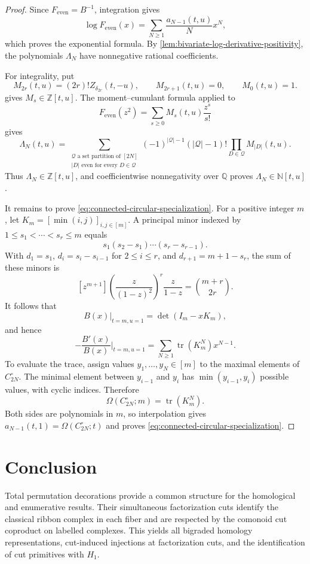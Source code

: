 \documentclass{amsart}
\theoremstyle{definition}
\theoremstyle{remark}
\begin{document}
\begin{proof}
Since $F_{\mathrm{even}}=B^{-1}$, integration gives
\[
 \log F_{\mathrm{even}}(x)
 =\sum_{N\geq1}\frac{a_{N-1}(t,u)}{N}x^N,
\]
which proves the exponential formula.  By
\cref{lem:bivariate-log-derivative-positivity}, the polynomials
$\Lambda_N$ have nonnegative rational coefficients.

For integrality, put
\[
 M_{2r}(t,u)=(2r)!Z_{\delta_{2r}}(t,-u),\qquad
 M_{2r+1}(t,u)=0,\qquad M_0(t,u)=1.
\]
 gives $M_s\in\mathbb Z[t,u]$.  The
moment--cumulant formula applied to
\[
 F_{\mathrm{even}}(z^2)=\sum_{s\geq0}M_s(t,u)\frac{z^s}{s!}
\]
gives
\[
 \Lambda_N(t,u)=
 \sum_{\substack{\mathcal Q\text{ a set partition of }[2N]\\
                   |D|\text{ even for every }D\in\mathcal Q}}
 (-1)^{|\mathcal Q|-1}(|\mathcal Q|-1)!
 \prod_{D\in\mathcal Q}M_{|D|}(t,u).
\]
Thus $\Lambda_N\in\mathbb Z[t,u]$, and coefficientwise nonnegativity over
$\mathbb Q$ proves $\Lambda_N\in\mathbb N[t,u]$.

It remains to prove \eqref{eq:connected-circular-specialization}.  For a
positive integer $m$, let $K_m=[\min(i,j)]_{i,j\in[m]}$.  A principal minor
indexed by $1\leq s_1<\cdots<s_r\leq m$ equals
\[
 s_1(s_2-s_1)\cdots(s_r-s_{r-1}).
\]
With $d_1=s_1$, $d_i=s_i-s_{i-1}$ for $2\leq i\leq r$, and
$d_{r+1}=m+1-s_r$, the sum of these minors is
\[
 [z^{m+1}]
 \left(\frac{z}{(1-z)^2}\right)^r\frac{z}{1-z}
 =\binom{m+r}{2r}.
\]
It follows that
\[
 B(x)|_{t=m,u=1}=\det(I_m-xK_m),
\]
and hence
\[
 -\frac{B'(x)}{B(x)}\bigg|_{t=m,u=1}
 =\sum_{N\geq1}\operatorname{tr}(K_m^N)x^{N-1}.
\]
To evaluate the trace, assign values $y_1,\ldots,y_N\in[m]$ to the maximal
elements of $C_{2N}^{\circ}$.  The minimal element between $y_{i-1}$ and
$y_i$ has $\min(y_{i-1},y_i)$ possible values, with cyclic indices.  Therefore
\[
 \Omega(C_{2N}^{\circ};m)=\operatorname{tr}(K_m^N).
\]
Both sides are polynomials in $m$, so interpolation gives
$a_{N-1}(t,1)=\Omega(C_{2N}^{\circ};t)$ and proves
\eqref{eq:connected-circular-specialization}.
\end{proof}

\section{Conclusion}
\label{sec:conclusion}

Total permutation decorations provide a common structure for the homological
and enumerative results.  Their simultaneous factorization cuts identify the
classical ribbon complex in each fiber and are respected by the comonoid
cut coproduct on labelled complexes.  This yields all bigraded homology representations, cut-induced
injections at factorization cuts, and the identification of
cut primitives with $H_1$.
\end{document}
